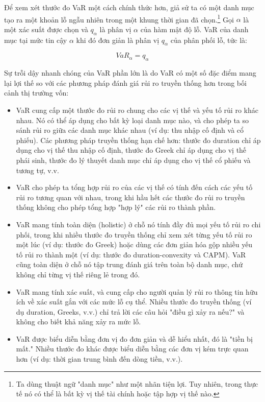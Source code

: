 Để xem xét thước đo VaR một cách chính thức hơn, giả sử ta có một danh mục tạo ra một khoản lỗ ngẫu nhiên trong một khung thời gian đã chọn.\footnote{Ta dùng thuật ngữ "danh mục" như một nhãn tiện lợi. Tuy nhiên, trong thực tế nó có thể là bất kỳ vị thế tài chính hoặc tập hợp vị thế nào.} Gọi $\alpha$ là một xác suất được chọn và $q_\alpha$ là phân vị $\alpha$ của hàm mật độ lỗ. VaR của danh mục tại mức tin cậy $\alpha$ khi đó đơn giản là phân vị $q_\alpha$ của phân phối lỗ, tức là:

\begin{equation*}
VaR_\alpha = q_\alpha \tag{1}
\end{equation*}

Sự trỗi dậy nhanh chóng của VaR phần lớn là do VaR có một số đặc điểm mang lại lợi thế so với các phương pháp đánh giá rủi ro truyền thống hơn trong bối cảnh thị trường vốn:

\begin{itemize}
  \item VaR cung cấp một thước đo rủi ro chung cho các vị thế và yếu tố rủi ro khác nhau. Nó có thể áp dụng cho bất kỳ loại danh mục nào, và cho phép ta so sánh rủi ro giữa các danh mục khác nhau (ví dụ: thu nhập cố định và cổ phiếu). Các phương pháp truyền thống hạn chế hơn: thước đo duration chỉ áp dụng cho vị thế thu nhập cố định, thước đo Greek chỉ áp dụng cho vị thế phái sinh, thước đo lý thuyết danh mục chỉ áp dụng cho vị thế cổ phiếu và tương tự, v.v.
  \item VaR cho phép ta tổng hợp rủi ro của các vị thế có tính đến cách các yếu tố rủi ro tương quan với nhau, trong khi hầu hết các thước đo rủi ro truyền thống không cho phép tổng hợp "hợp lý" các rủi ro thành phần.
  \item VaR mang tính toàn diện (holistic) ở chỗ nó tính đầy đủ mọi yếu tố rủi ro chi phối, trong khi nhiều thước đo truyền thống chỉ xem xét từng yếu tố rủi ro một lúc (ví dụ: thước đo Greek) hoặc dùng các đơn giản hóa gộp nhiều yếu tố rủi ro thành một (ví dụ: thước đo duration-convexity và CAPM). VaR cũng toàn diện ở chỗ nó tập trung đánh giá trên toàn bộ danh mục, chứ không chỉ từng vị thế riêng lẻ trong đó.
  \item VaR mang tính xác suất, và cung cấp cho người quản lý rủi ro thông tin hữu ích về xác suất gắn với các mức lỗ cụ thể. Nhiều thước đo truyền thống (ví dụ duration, Greeks, v.v.) chỉ trả lời các câu hỏi "điều gì xảy ra nếu?" và không cho biết khả năng xảy ra mức lỗ.
  \item VaR được biểu diễn bằng đơn vị đo đơn giản và dễ hiểu nhất, đó là "tiền bị mất." Nhiều thước đo khác được biểu diễn bằng các đơn vị kém trực quan hơn (ví dụ: thời gian trung bình đến dòng tiền, v.v.).
\end{itemize}

